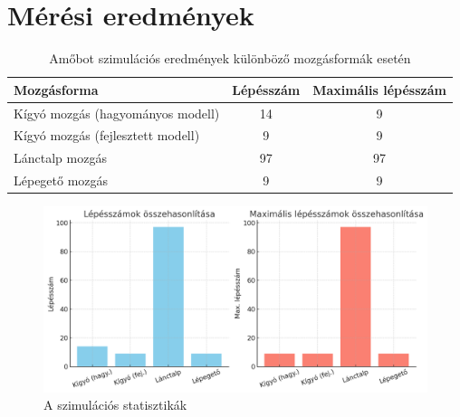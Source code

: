 \documentclass[	
  noindent
]{elteikthesis}[2024/04/26]
\begin{document}
  \section{Mérési eredmények}
    \begin{table}[h!]
      \centering
      \begin{tabular}{|l|c|c|}
      \hline
      \textbf{Mozgásforma} & \textbf{Lépésszám} & \textbf{Maximális lépésszám} \\
      \hline
      Kígyó mozgás (hagyományos modell) & 14 & 9 \\
      Kígyó mozgás (fejlesztett modell) & 9 & 9 \\
      Lánctalp mozgás & 97 & 97 \\
      Lépegető mozgás & 9 & 9 \\
      \hline
      \end{tabular}
      \caption{Amőbot szimulációs eredmények különböző mozgásformák esetén}
      \label{tab:amobot_eredmenyek}
      \end{table}
  
      \begin{figure}[H]
        \centering
        \includegraphics[width=1.0\textwidth]{images/mesurements/stat.png}
        \caption{A szimulációs statisztikák}
        \label{fig:stat}
      \end{figure}
\end{document}
